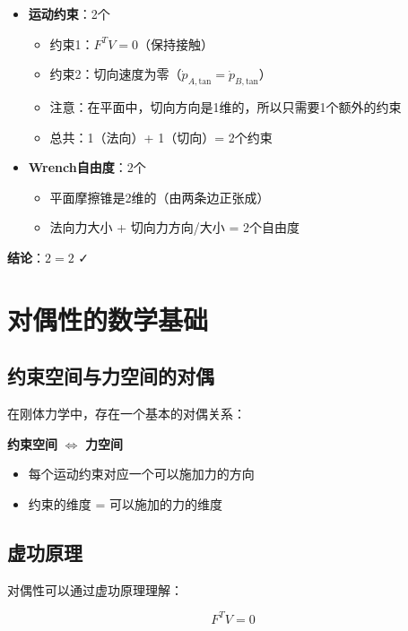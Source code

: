 \documentclass[12pt,a4paper]{article}
\begin{document}
\begin{itemize}
    \item \textbf{运动约束}：2个
    \begin{itemize}
        \item 约束1：$F^T V = 0$（保持接触）
        \item 约束2：切向速度为零（$\dot{p}_{A,\text{tan}} = \dot{p}_{B,\text{tan}}$）
        \item 注意：在平面中，切向方向是1维的，所以只需要1个额外的约束
        \item 总共：1（法向）+ 1（切向）= 2个约束
    \end{itemize}
    \item \textbf{Wrench自由度}：2个
    \begin{itemize}
        \item 平面摩擦锥是2维的（由两条边正张成）
        \item 法向力大小 + 切向力方向/大小 = 2个自由度
    \end{itemize}
\end{itemize}

\textbf{结论}：$2 = 2$ ✓

\section{对偶性的数学基础}

\subsection{约束空间与力空间的对偶}

在刚体力学中，存在一个基本的对偶关系：

\begin{center}
\textbf{约束空间} $\Leftrightarrow$ \textbf{力空间}
\end{center}

\begin{itemize}
    \item 每个运动约束对应一个可以施加力的方向
    \item 约束的维度 = 可以施加的力的维度
\end{itemize}

\subsection{虚功原理}

对偶性可以通过虚功原理理解：

\begin{equation}
F^T V = 0
\end{equation}
\end{document}
